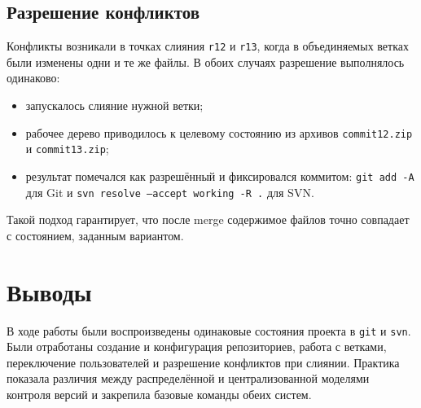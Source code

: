 \documentclass[12pt]{article}
\begin{document}
\subsection{Разрешение конфликтов}

Конфликты возникали в точках слияния \texttt{r12} и \texttt{r13}, когда в
объединяемых ветках были изменены одни и те же файлы. В обоих случаях
разрешение выполнялось одинаково:

\begin{itemize}[leftmargin=1.5em]
    \item запускалось слияние нужной ветки;
    \item рабочее дерево приводилось к целевому состоянию из архивов
    \texttt{commit12.zip} и \texttt{commit13.zip};
    \item результат помечался как разрешённый и фиксировался коммитом:
    \texttt{git add -A} для Git и
    \texttt{svn resolve --accept working -R .} для SVN.
\end{itemize}

Такой подход гарантирует, что после merge содержимое файлов точно совпадает
с состоянием, заданным вариантом.

\section{Выводы}

В ходе работы были воспроизведены одинаковые состояния проекта в
\texttt{git} и \texttt{svn}. Были отработаны создание и конфигурация
репозиториев, работа с ветками, переключение пользователей и разрешение
конфликтов при слиянии. Практика показала различия между распределённой
и централизованной моделями контроля версий и закрепила базовые команды
обеих систем.
\end{document}
